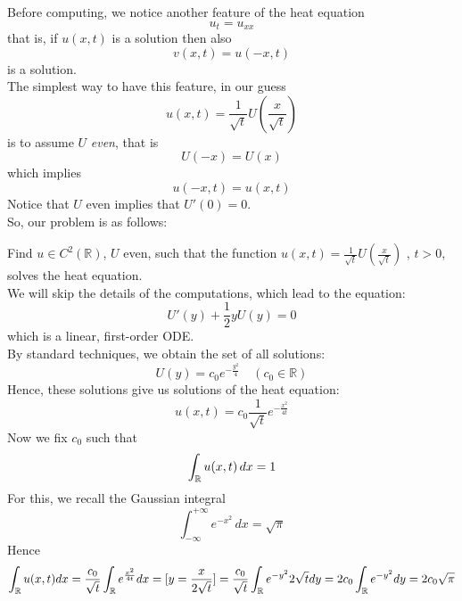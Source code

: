 Before computing, we notice another feature of the heat equation
\begin{equation*}
    u_t = u_{xx}
\end{equation*}
that is, if $u(x,t)$ is a solution then also 
\begin{equation*}
    v(x,t) = u(-x,t) 
\end{equation*}
is a solution. \\
The simplest way to have this feature, in our guess
\begin{equation*}
    u(x,t) = \frac{1}{\sqrt{t}} U(\frac{x}{\sqrt{t}})
\end{equation*}
is to assume $U$ \emph{even}, that is 
\begin{equation*}
    U(-x) = U(x)
\end{equation*}
which implies 
\begin{equation*}
    u(-x,t) = u(x,t)
\end{equation*}
Notice that $U$ even implies that $U'(0) = 0$. \\
So, our problem is as follows:

Find \( u \in C^2(\mathbb{R}) \), $U$ even, such that the function \( u(x,t) = \frac{1}{\sqrt{t}} U( \frac{x}{\sqrt{t}})\) , $t>0$, solves the heat equation. \\
We will skip the details of the computations, which lead to the equation:
\[
U'(y) + \frac{1}{2}yU(y) = 0
\]
which is a linear, first-order ODE.\\
By standard techniques, we obtain the set of all solutions:
\begin{equation*}
    U(y) = c_0 e^{-\frac{y^2}{4}} \quad (c_0 \in \mathbb{R})
\end{equation*}
Hence, these solutions give us solutions of the heat equation:
\begin{equation*}
    u(x,t)= c_0 \frac{1}{\sqrt{t}} e^{- \frac{x^2}{4t}}
\end{equation*}
Now we fix $c_0$ such that 
\begin{equation*}
    \int_{\mathbb{R}} u(x,t) \, dx= 1
\end{equation*}
For this, we recall the Gaussian integral
\begin{equation*}
    \int_{-\infty}^{+\infty} e^{-x^2} \, dx  = \sqrt{\pi}
\end{equation*}
Hence 
\begin{equation*}
    \int_{\mathbb{R}} u(x,t) dx = \frac{c_0}{\sqrt{t}} \int_{\mathbb{R}} e^{\frac{x^2}{4t}} dx = [y  =\frac{x}{2 \sqrt{t}}] = \frac{c_0}{\sqrt{t}} \int_{\mathbb{R}} e^{-y^2}2 \sqrt{t} dy = 2 c_0 \int_{\mathbb{R}} e^{-y^2} dy = 2 c_0 \sqrt{\pi} 
\end{equation*}



